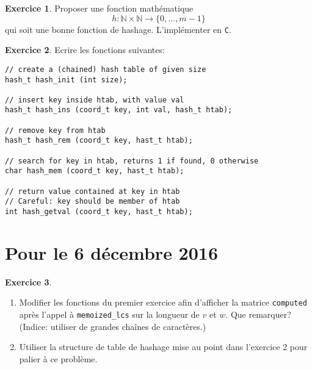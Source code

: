 \documentclass[french,a4paper]{article}
\theoremstyle{definition}
\newtheorem{exercise}{Exercice}
\theoremstyle{remark}
\newcommand{\inlinec}[1]{\lstinline[style=C]°#1°}
\begin{document}
\begin{exercise}
  Proposer une fonction mathématique
  \begin{displaymath}
    h : \mathbb N\times \mathbb N\to \{0,\dots,m-1\}
  \end{displaymath}
  qui soit une bonne fonction de hashage. L'implémenter en {\tt C}.
\end{exercise}

\begin{exercise}
  Ecrire les fonctions suivantes:
\begin{lstlisting}
// create a (chained) hash table of given size
hash_t hash_init (int size);

// insert key inside htab, with value val
hash_t hash_ins (coord_t key, int val, hash_t htab);

// remove key from htab
hash_t hash_rem (coord_t key, hast_t htab);

// search for key in htab, returns 1 if found, 0 otherwise
char hash_mem (coord_t key, hast_t htab);

// return value contained at key in htab
// Careful: key should be member of htab
int hash_getval (coord_t key, hast_t htab);
\end{lstlisting}
\end{exercise}

\section{Pour le 6 décembre 2016}
\label{sec:homeworks}

\begin{exercise}~%
  \begin{enumerate}[label=(\roman*)]
  \item Modifier les fonctions du premier exercice afin d'afficher la
    matrice \inlinec{computed} après l'appel à \inlinec{memoized_lcs}
    sur la longueur de $v$ et $w$. Que remarquer? (Indice: utiliser de
    grandes chaînes de caractères.)
  \item Utiliser la structure de table de hashage mise au point dans
    l'exercice 2 pour palier à ce problème.
  \end{enumerate}
\end{exercise}
\end{document}
